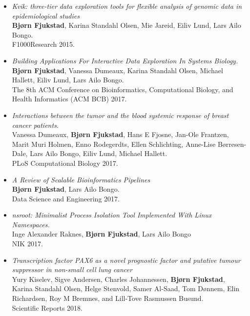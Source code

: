 \begin{itemize}
    \item
        \emph{Kvik: three-tier data exploration tools for flexible analysis of
        genomic data in epidemiological studies}
        \\
        \textbf{Bjørn Fjukstad}, Karina Standahl Olsen, Mie Jareid, Eiliv Lund,
        Lars Ailo Bongo. 
        \\ 
        F1000Research 2015.
        
    \item 
        \emph{Building Applications For Interactive Data Exploration In Systems
        Biology.}
        \\
        \textbf{Bjørn Fjukstad}, Vanessa Dumeaux, Karina Standahl Olsen, Michael
        Hallett, Eiliv Lund, Lars Ailo Bongo.  
        \\ 
        The 8th ACM Conference on Bioinformatics, Computational Biology, and
        Health Informatics (ACM BCB) 2017.

    \item 
        \emph{Interactions between the tumor and the blood systemic response of
        breast cancer patients.}
        \\ 
        Vanessa Dumeaux, \textbf{Bjørn Fjukstad}, Hans E Fjosne, Jan-Ole
        Frantzen, Marit Muri Holmen, Enno Rodegerdts, Ellen Schlichting,
        Anne-Lise Børresen-Dale, Lars Ailo Bongo, Eiliv Lund, Michael Hallett.
        \\ 
        PLoS Computational Biology 2017.

    \item \emph{A Review of Scalable Bioinformatics Pipelines} 
        \\
        \textbf{Bjørn Fjukstad}, Lars Ailo Bongo.
        \\ 
        Data Science and Engineering 2017.

        

    \item \emph{nsroot: Minimalist Process Isolation Tool Implemented With Linux
        Namespaces.}
        \\
        Inge Alexander Raknes, \textbf{Bjørn Fjukstad}, Lars Ailo Bongo 
        \\
        NIK 2017. 


    \item \emph{Transcription factor PAX6 as a novel prognostic factor and
        putative tumour suppressor in non-small cell lung cancer} 
        \\
        Yury Kiselev, Sigve Andersen, Charles Johannessen, \textbf{Bjørn
        Fjukstad}, Karina Standahl Olsen, Helge Stenvold, Samer Al-Saad, Tom
        Dønnem, Elin Richardsen, Roy M Bremnes, and Lill-Tove Rasmussen Busund. 
        \\
        Scientific Reports 2018. 


\end{itemize}
